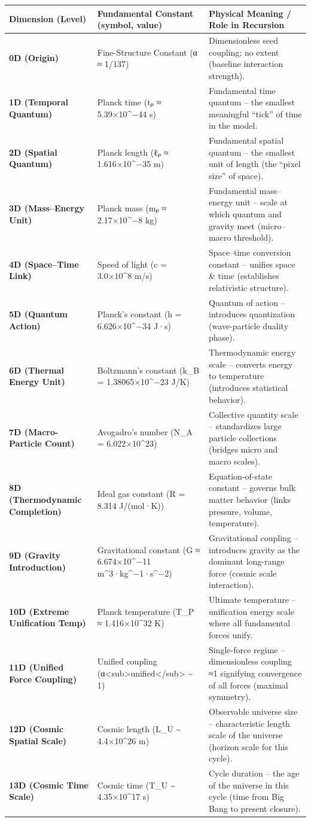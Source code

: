 \begin{longtable}[]{@{}lll@{}}
\toprule
\textbf{Dimension (Level)} & \textbf{Fundamental Constant (symbol,
value)} & \textbf{Physical Meaning / Role in Recursion}\tabularnewline
\midrule
\endhead
\textbf{0D (Origin)} & Fine-Structure Constant (α ≈ 1/137) &
Dimensionless seed coupling; no extent (baseline interaction
strength)​.\tabularnewline
\textbf{1D (Temporal Quantum)} & Planck time (tₚ ≈ 5.39×10\^{}−44 s) &
Fundamental time quantum -- the smallest meaningful ``tick'' of time in
the model.\tabularnewline
\textbf{2D (Spatial Quantum)} & Planck length (ℓₚ ≈ 1.616×10\^{}−35 m) &
Fundamental spatial quantum -- the smallest unit of length (the ``pixel
size'' of space)​.\tabularnewline
\textbf{3D (Mass--Energy Unit)} & Planck mass (mₚ ≈ 2.17×10\^{}−8 kg) &
Fundamental mass--energy unit -- scale at which quantum and gravity meet
(micro--macro threshold)​.\tabularnewline
\textbf{4D (Space--Time Link)} & Speed of light (c = 3.0×10\^{}8 m/s) &
Space--time conversion constant -- unifies space \& time (establishes
relativistic structure)​.\tabularnewline
\textbf{5D (Quantum Action)} & Planck's constant (h = 6.626×10\^{}−34
J·s) & Quantum of action -- introduces quantization (wave-particle
duality phase)​.\tabularnewline
\textbf{6D (Thermal Energy Unit)} & Boltzmann's constant (k\_B =
1.38065×10\^{}−23 J/K) & Thermodynamic energy scale -- converts energy
to temperature (introduces statistical behavior)​.\tabularnewline
\textbf{7D (Macro-Particle Count)} & Avogadro's number (N\_A =
6.022×10\^{}23) & Collective quantity scale -- standardizes large
particle collections (bridges micro and macro scales)​.\tabularnewline
\textbf{8D (Thermodynamic Completion)} & Ideal gas constant (R = 8.314
J/(mol·K)) & Equation-of-state constant -- governs bulk matter behavior
(links pressure, volume, temperature)​.\tabularnewline
\textbf{9D (Gravity Introduction)} & Gravitational constant (G ≈
6.674×10\^{}−11 m\^{}3·kg\^{}−1·s\^{}−2) & Gravitational coupling --
introduces gravity as the dominant long-range force (cosmic scale
interaction)​.\tabularnewline
\textbf{10D (Extreme Unification Temp)} & Planck temperature (T\_P ≈
1.416×10\^{}32 K) & Ultimate temperature -- unification energy scale
where all fundamental forces unify​.\tabularnewline
\textbf{11D (Unified Force Coupling)} & Unified coupling
(α\textless{}sub\textgreater{}unified\textless{}/sub\textgreater{}
\textasciitilde{} 1) & Single-force regime -- dimensionless coupling ≈1
signifying convergence of all forces (maximal symmetry)​.\tabularnewline
\textbf{12D (Cosmic Spatial Scale)} & Cosmic length (L\_U
\textasciitilde{} 4.4×10\^{}26 m) & Observable universe size --
characteristic length scale of the universe (horizon scale for this
cycle)​.\tabularnewline
\textbf{13D (Cosmic Time Scale)} & Cosmic time (T\_U \textasciitilde{}
4.35×10\^{}17 s) & Cycle duration -- the age of the universe in this
cycle (time from Big Bang to present closure)​.\tabularnewline
\bottomrule
\end{longtable}


